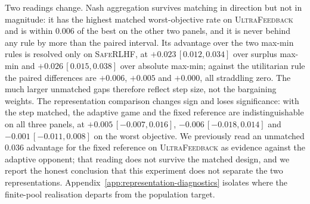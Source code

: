\documentclass{article}
\theoremstyle{remark}
\theoremstyle{plain}
\begin{document}
Two readings change. Nash aggregation survives matching in direction but not in magnitude: it has
the highest matched worst-objective rate on \textsc{UltraFeedback} and is within $0.006$ of the
best on the other two panels, and it is never behind any rule by more than the paired interval. Its
advantage over the two max-min rules is resolved only on \textsc{SafeRLHF}, at $+0.023\,[0.012,
0.034]$ over surplus max-min and $+0.026\,[0.015, 0.038]$ over absolute max-min; against the
utilitarian rule the paired differences are $+0.006$, $+0.005$ and $+0.000$, all straddling zero.
The much larger unmatched gaps therefore reflect step size, not the bargaining weights. The
representation comparison changes sign and loses significance: with the step matched, the adaptive
game and the fixed reference are indistinguishable on all three panels, at $+0.005\,[-0.007,
0.016]$, $-0.006\,[-0.018, 0.014]$ and $-0.001\,[-0.011, 0.008]$ on the worst objective. We
previously read an unmatched $0.036$ advantage for the fixed reference on \textsc{UltraFeedback} as
evidence against the adaptive opponent; that reading does not survive the matched design, and we
report the honest conclusion that this experiment does not separate the two representations.
Appendix~\ref{app:representation-diagnostics} isolates where the finite-pool realisation departs
from the population target.
\end{document}
